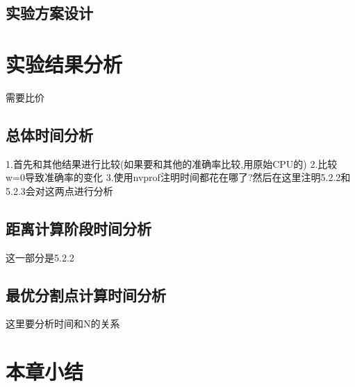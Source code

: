 \subsection{实验方案设计}

\section{实验结果分析}

需要比价

\subsection{总体时间分析}
1.首先和其他结果进行比较(如果要和其他的准确率比较,用原始CPU的)
2.比较w=0导致准确率的变化
3.使用nvprof注明时间都花在哪了?然后在这里注明5.2.2和5.2.3会对这两点进行分析
\subsection{距离计算阶段时间分析}
这一部分是5.2.2
\subsection{最优分割点计算时间分析}
这里要分析时间和N的关系
\section{本章小结}